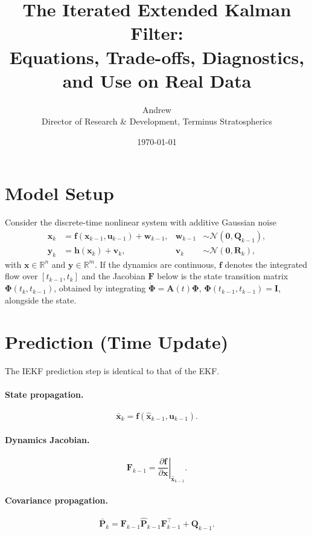 \documentclass[11pt]{article}
\title{The Iterated Extended Kalman Filter:\\
Equations, Trade-offs, Diagnostics, and Use on Real Data}
\author{Andrew\\ \small Director of Research \& Development, Terminus Stratospherics}
\date{\today}
\newcommand{\x}{\bm{x}}
\newcommand{\y}{\bm{y}}
\newcommand{\uvec}{\bm{u}}
\newcommand{\w}{\bm{w}}
\newcommand{\vvec}{\bm{v}}
\newcommand{\dyn}{\bm{f}}
\newcommand{\meas}{\bm{h}}
\newcommand{\F}{\bm{F}}
\newcommand{\Pm}{\bm{P}}
\newcommand{\Q}{\bm{Q}}
\newcommand{\R}{\bm{R}}
\newcommand{\I}{\bm{I}}
\newcommand{\xbar}{\bar{\x}}
\newcommand{\xhat}{\hat{\x}}
\newcommand{\Pbar}{\bar{\Pm}}
\newcommand{\Phat}{\hat{\Pm}}
\newcommand{\Normal}{\mathcal{N}}
\begin{document}
\maketitle
\tableofcontents

\section{Model Setup}

Consider the discrete-time nonlinear system with additive Gaussian noise
\begin{align}
  \x_k &= \dyn(\x_{k-1}, \uvec_{k-1}) + \w_{k-1}, & \w_{k-1} &\sim \Normal(\bm{0}, \Q_{k-1}), \label{eq:dyn}\\
  \y_k &= \meas(\x_k) + \vvec_k, & \vvec_k &\sim \Normal(\bm{0}, \R_k), \label{eq:meas}
\end{align}
with $\x \in \mathbb{R}^n$ and $\y \in \mathbb{R}^m$. If the dynamics are continuous,
$\dyn$ denotes the integrated flow over $[t_{k-1}, t_k]$ and the Jacobian $\F$ below is the
state transition matrix $\boldsymbol{\Phi}(t_k, t_{k-1})$, obtained by integrating
$\dot{\boldsymbol{\Phi}} = \mathbf{A}(t)\boldsymbol{\Phi}$, $\boldsymbol{\Phi}(t_{k-1},t_{k-1}) = \I$,
alongside the state.

\section{Prediction (Time Update)}

The IEKF prediction step is identical to that of the EKF.

\paragraph{State propagation.}
\begin{equation}
  \xbar_k = \dyn(\xhat_{k-1}, \uvec_{k-1}).
\end{equation}

\paragraph{Dynamics Jacobian.}
\begin{equation}
  \F_{k-1} = \left.\frac{\partial \dyn}{\partial \x}\right|_{\xhat_{k-1}}.
\end{equation}

\paragraph{Covariance propagation.}
\begin{equation}
  \Pbar_k = \F_{k-1}\Phat_{k-1}\F_{k-1}^\top + \Q_{k-1}.
\end{equation}
\end{document}
